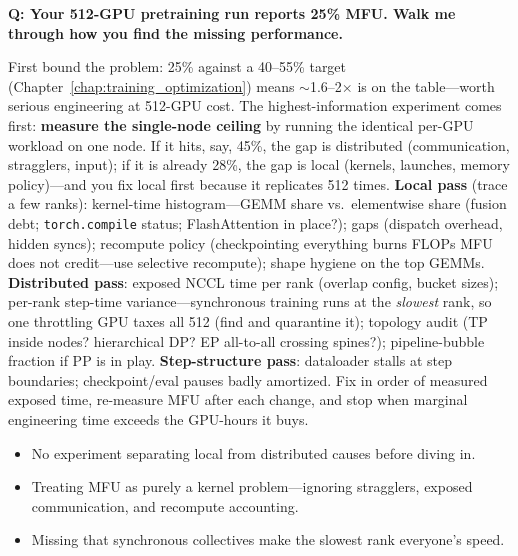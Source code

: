 \begin{interviewq}
\textbf{Q: Your 512-GPU pretraining run reports 25\% MFU. Walk me through how you find the missing performance.}

 \quad {} \quad \badgefreq{\freqmed}

\stronganswer First bound the problem: 25\% against a 40--55\% target (Chapter~\ref{chap:training_optimization}) means $\sim$1.6--2$\times$ is on the table---worth serious engineering at 512-GPU cost. The highest-information experiment comes first: \textbf{measure the single-node ceiling} by running the identical per-GPU workload on one node. If it hits, say, 45\%, the gap is distributed (communication, stragglers, input); if it is already 28\%, the gap is local (kernels, launches, memory policy)---and you fix local first because it replicates 512 times. \textbf{Local pass} (trace a few ranks): kernel-time histogram---GEMM share vs.\ elementwise share (fusion debt; \texttt{torch.compile} status; FlashAttention in place?); gaps (dispatch overhead, hidden syncs); recompute policy (checkpointing everything burns FLOPs MFU does not credit---use selective recompute); shape hygiene on the top GEMMs. \textbf{Distributed pass}: exposed NCCL time per rank (overlap config, bucket sizes); per-rank step-time variance---synchronous training runs at the \textit{slowest} rank, so one throttling GPU taxes all 512 (find and quarantine it); topology audit (TP inside nodes? hierarchical DP? EP all-to-all crossing spines?); pipeline-bubble fraction if PP is in play. \textbf{Step-structure pass}: dataloader stalls at step boundaries; checkpoint/eval pauses badly amortized. Fix in order of measured exposed time, re-measure MFU after each change, and stop when marginal engineering time exceeds the GPU-hours it buys.

\redflags
\begin{itemize}
    \item No experiment separating local from distributed causes before diving in.
    \item Treating MFU as purely a kernel problem---ignoring stragglers, exposed communication, and recompute accounting.
    \item Missing that synchronous collectives make the slowest rank everyone's speed.
\end{itemize}



\end{interviewq}
